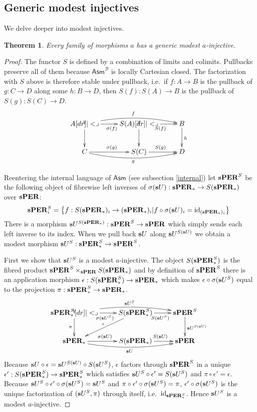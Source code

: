 \documentclass{amsart}
\theoremstyle{plain}
\newtheorem{theorem}{Theorem}
\theoremstyle{definition}
\newcommand\hide[1]{}
\newcommand\cat\mathcal
\newcommand\set[1]{\left\{#1\right\}}
\newcommand\id{\mathrm{id}}
\newcommand\Asm{\mathsf{Asm}}
\begin{document}
\subsection{Generic modest injectives} We delve deeper into modest injectives.

\begin{theorem} Every family of morphisms $a$ has a generic modest $a$-injective. \label{geninjmod} \end{theorem}

\begin{proof} The functor $S$ is defined by a combination of limits and colimits. Pullbacks preserve all of them because $\Asm^{\cat B}$ is locally Cartesian closed. The factorization with $S$ above is therefore stable under pullback, i.e.\ if $f: A\to B$ is the pullback of $g:C\to D$ along some $h:B\to D$, then $S(f):S(A)\to B$ is the pullback of $S(g):S(C) \to D$.
\[\xymatrix{
A\ar[r]_{\sigma(f)} \ar@/^2ex/[rr]^{f}\ar[d]\pb & S(A) \ar[r]_{S(f)}\ar[d]\pb & B\ar[d]^h\\
C\ar[r]^{\sigma(g)} \ar@/_2ex/[rr]_{g} & S(C) \ar[r]^{S(g)} & D
}\]

Reentering the internal language of $\Asm$ (see subsection \ref{internal}) let $\mathbf{s}\mathbf{PER}^S$ be the following object of fibrewise left inverses of $\sigma(\mathbf{s} U):\mathbf{s}\mathbf{PER}_* \to S(\mathbf{s}\mathbf{PER}_*)$ over $\mathbf{s}\mathbf{PER}$:
\[ \rat\pers^S_i = \set{ f:S(\rat\pers_*)_i\to (\rat\pers_*)_i| f\circ\sigma(\rat U)_i = \id_{(\rat\pers_*)_i}} \] 
There is a morphism $\mathbf{s} U^{S(\mathbf{s}\mathbf{PER}_*)}:\mathbf{s}\mathbf{PER}^S\to \mathbf{s}\mathbf{PER}$ which simply sends each left inverse to its index.
When we pull back $\mathbf{s} U$ along $\mathbf{s} U^{S(\mathbf{s} U)}$ we obtain a modest morphism $\mathbf{s} U^S:\mathbf{s}\mathbf{PER}_*^S \to \mathbf{s}\mathbf{PER}^S$.

First we show that $\mathbf{s} U^S$ is a modest $a$-injective.
The object $S(\mathbf{s}\mathbf{PER}_*^S)$ is the fibred product $\mathbf{s}\mathbf{PER}^S\times_{\mathbf{s}\mathbf{PER}}S(\mathbf{s}\mathbf{PER}_*)$ and by definition of $\mathbf{s}\mathbf{PER}^S$ there is an application morphism $\epsilon:S(\mathbf{s}\mathbf{PER}_*^S)\to \mathbf{s}\mathbf{PER}_*$ which makes $\epsilon\circ \sigma(\mathbf{s} U^S)$ equal to the projection $\pi:\mathbf{s}\mathbf{PER}_*^S\to\mathbf{s}\mathbf{PER}_*$.
\[\xymatrix{
\rat\pers_*^S\ar[r]_{\sigma(\rat U^S)} \ar@/^2ex/[rr]^{\rat U^S}\ar[d]_\pi\pb & S(\rat\pers_*^S) \ar[r]_{S(\rat U^S)}\hide{\ar[d]_{(}^{)}\pb}\ar[dl]_\epsilon & \rat\pers^S\ar[d]^{\rat U^{S(\rat U)}}\\
\rat\pers_*\ar[r]^{\sigma(\rat U)} \ar@/_2ex/[rr]_{\rat U} & S(\rat\pers_*) \ar[r]^{S(\rat U)} & \rat\pers
}\]
\hide{Warning: in this diagram $\sigma(\rat U)\circ\epsilon$ is not equal to the projection $S(\rat\pers_*^S) \to S(\rat\pers_*)$, hence the parentheses in the diagram above. }Because $\mathbf{s} U\circ \epsilon = \mathbf{s} U^{S(\mathbf{s} U)}\circ S(\mathbf{s} U^S)$, $\epsilon$ factors through $\mathbf{s}\mathbf{PER}^S$ in a unique $\epsilon':S(\mathbf{s}\mathbf{PER}_*^S)\to\mathbf{s}\mathbf{PER}_*^S$ which satisfies $\mathbf{s} U^S\circ\epsilon' = S(\mathbf{s} U^S)$ and $\pi\circ \epsilon'= \epsilon$. Because $\mathbf{s} U^S\circ\epsilon'\circ \sigma(\mathbf{s} U^S) = \mathbf{s} U^S$ and $\pi\circ \epsilon'\circ \sigma(\mathbf{s} U^S) = \pi$, $\epsilon'\circ \sigma(\mathbf{s} U^S)$ is the unique factorization of $(\mathbf{s} U^S,\pi)$ through itself, i.e.\ $\id_{\rat\pers_*^S}$. Hence $\mathbf{s} U^S$ is a modest $a$-injective.


\end{proof}
\end{document}
